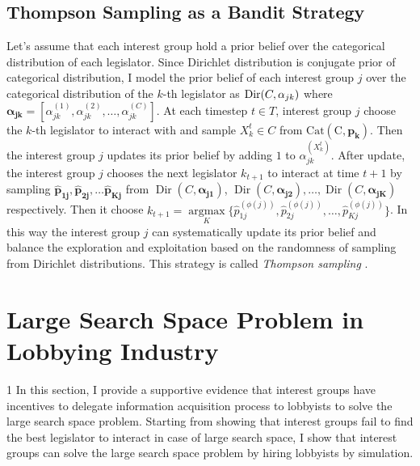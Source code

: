 \documentclass{article}
\begin{document}
\subsection{Thompson Sampling as a Bandit Strategy}
Let's assume that 
each interest group
hold a prior belief over the 
categorical distribution of each legislator.
Since Dirichlet distribution is conjugate prior of categorical distribution,
I model the prior belief of each interest group $j$ over the categorical distribution of the $k$-th legislator as
$\operatorname{Dir}(C, \boldmath{\alpha}_{jk})$ where 
$\mathbf{\alpha_{jk}} = [\alpha_{jk}^{(1)}, \alpha_{jk}^{(2)}, \hdots, \alpha_{jk}^{(C)}]$.
At each timestep $t\in T$, interest group $j$ choose the $k$-th legislator to 
interact with and sample $X_k^t \in C$ from $\operatorname{Cat(C, \mathbf{p_k})}$.
Then the interest group $j$ updates its prior belief by adding $1$ to $\alpha_{jk}^{(X_k^t)}$.
After update, the interest group $j$ chooses the next legislator $k_{t+1}$ 
to interact at time $t+1$
by sampling $\mathbf{\hat{p}_{1j}}, \mathbf{\hat{p}_{2j}}, \hdots \mathbf{\hat{p}_{Kj}}$ 
from $\operatorname{Dir}(C, \mathbf{\alpha_{j1}})$,  $\operatorname{Dir}(C, \mathbf{\alpha_{j2}}), \hdots, \operatorname{Dir}(C, \mathbf{\alpha_{jK}})$ respectively.
Then it
choose $k_{t+1} = \underset{K}{\operatorname{argmax}}\{\hat{p}^{(\phi(j))}_{1j}, \hat{p}^{(\phi(j))}_{2j}, \hdots, \hat{p}^{(\phi(j))}_{Kj}\}$.
In this way the interest group $j$ can systematically update
its prior belief and
balance the exploration and exploitation based on the 
randomness of sampling from Dirichlet distributions.
This strategy is called \textit{Thompson sampling} \citep{tom}.
\section{Large Search Space Problem in Lobbying Industry}
1
In this section, I provide a supportive evidence
that interest groups 
have incentives to delegate information acquisition process to lobbyists
to solve the large search space problem. Starting from showing that 
interest groups fail to 
find the best legislator to interact in
case of large search space,
I show that 
interest groups can solve the large search space problem
by hiring lobbyists by simulation.
\end{document}

